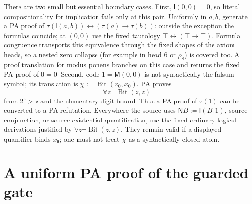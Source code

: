 \documentclass[11pt]{article}
\newcommand{\Bit}{\operatorname{Bit}}
\newcommand{\I}{\mathsf I}
\newcommand{\M}{\mathsf M}
\newcommand{\N}{\mathsf N}
\newcommand{\tr}{\tau}
\begin{document}
There are two small but essential boundary cases.
First, $\I(0,0)=0$, so literal compositionality for implication fails only
at this pair.  Uniformly in $a,b$, generate a PA proof of
$\tr(\I(a,b))\leftrightarrow(\tr(a)\to\tr(b))$: outside the
exception the formulas coincide; at $(0,0)$ use the fixed tautology
$\top\leftrightarrow(\top\to\top)$.  Formula congruence transports
this equivalence through the fixed shapes of the axiom heads, so a nested
zero collapse (for example in head 6 or $\rho_8$) is covered too.
A proof translation for modus ponens branches on this
case and returns the fixed PA proof of $0=0$.
Second, code $1=\M(0,0)$ is not syntactically the falsum symbol; its
translation is $\chi:=\Bit(x_0,x_0)$.  PA proves
\[
 \forall z\,\neg\Bit(z,z)
\]
from $2^z>z$ and the elementary digit bound.  Thus a PA proof of
$\tr(1)$ can be converted to a PA refutation.  Everywhere the source
uses $\N B:=\I(B,1)$, source conjunction, or source existential
quantification, use the fixed ordinary logical derivations justified
by $\forall z\neg\Bit(z,z)$.  They remain valid if a displayed
quantifier binds $x_0$; one must not treat $\chi$ as a syntactically
closed atom.

\section{A uniform PA proof of the guarded gate}
\end{document}
